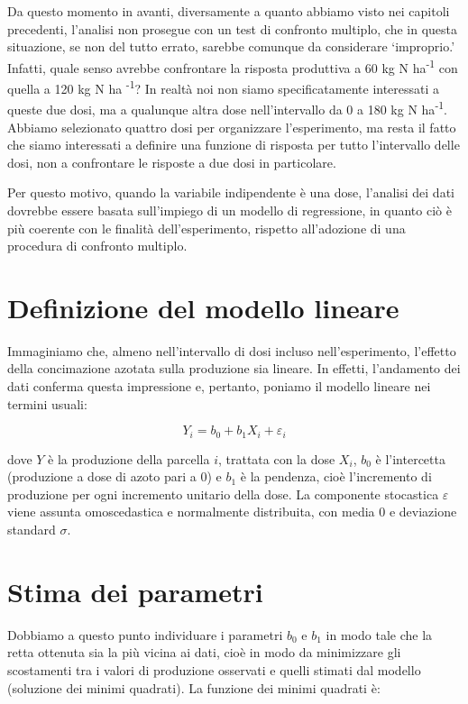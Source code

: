 \documentclass[a4paper,12pt,oneside]{book}
\begin{document}
Da questo momento in avanti, diversamente a quanto abbiamo visto nei capitoli precedenti, l'analisi non prosegue con un test di confronto multiplo, che in questa situazione, se non del tutto errato, sarebbe comunque da considerare `improprio.' Infatti, quale senso avrebbe confrontare la risposta produttiva a 60 kg N ha\textsuperscript{-1} con quella a 120 kg N ha \textsuperscript{-1}? In realtà noi non siamo specificatamente interessati a queste due dosi, ma a qualunque altra dose nell'intervallo da 0 a 180 kg N ha\textsuperscript{-1}. Abbiamo selezionato quattro dosi per organizzare l'esperimento, ma resta il fatto che siamo interessati a definire una funzione di risposta per tutto l'intervallo delle dosi, non a confrontare le risposte a due dosi in particolare.

Per questo motivo, quando la variabile indipendente è una dose, l'analisi dei dati dovrebbe essere basata sull'impiego di un modello di regressione, in quanto ciò è più coerente con le finalità dell'esperimento, rispetto all'adozione di una procedura di confronto multiplo.

\hypertarget{definizione-del-modello-lineare}{%
\section{Definizione del modello lineare}\label{definizione-del-modello-lineare}}

Immaginiamo che, almeno nell'intervallo di dosi incluso nell'esperimento, l'effetto della concimazione azotata sulla produzione sia lineare. In effetti, l'andamento dei dati conferma questa impressione e, pertanto, poniamo il modello lineare nei termini usuali:

\[Y_i = b_0 + b_1 X_i + \varepsilon_i\]

dove \(Y\) è la produzione della parcella \(i\), trattata con la dose \(X_i\), \(b_0\) è l'intercetta (produzione a dose di azoto pari a 0) e \(b_1\) è la pendenza, cioè l'incremento di produzione per ogni incremento unitario della dose. La componente stocastica \(\varepsilon\) viene assunta omoscedastica e normalmente distribuita, con media 0 e deviazione standard \(\sigma\).

\hypertarget{stima-dei-parametri-2}{%
\section{Stima dei parametri}\label{stima-dei-parametri-2}}

Dobbiamo a questo punto individuare i parametri \(b_0\) e \(b_1\) in modo tale che la retta ottenuta sia la più vicina ai dati, cioè in modo da minimizzare gli scostamenti tra i valori di produzione osservati e quelli stimati dal modello (soluzione dei minimi quadrati). La funzione dei minimi quadrati è:
\end{document}
